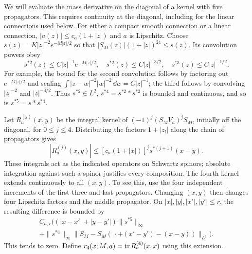 We will evaluate the mass derivative on the diagonal of a kernel with
five propagators. This requires continuity at the diagonal, including
for the linear connections used below. For either a compact smooth
connection or a linear connection, $|a(z)|\le c_a(1+|z|)$ and
$a$ is Lipschitz. Choose
$s(z)=K|z|^{-2}e^{-M|z|/2}$ so that
$|S_M(z)|(1+|z|)^{24}\le s(z)$. Its convolution powers obey
\begin{equation}\label{eq:probe-convolutions}
 s^{*2}(z)\le C|z|^{-1}e^{-M|z|/2},\quad
 s^{*2}(z)\le C|z|^{-3/2},\quad
 s^{*3}(z)\le C|z|^{-1/2}.
\end{equation}
For example, the bound for the second convolution follows by factoring
out $e^{-M|z|/2}$ and scaling
$\int|z-w|^{-2}|w|^{-2}\,\dd w=C|z|^{-1}$; the third follows by
convolving $|z|^{-2}$ and $|z|^{-3/2}$. Thus $s^{*2}\in L^2$,
$s^{*4}=s^{*2}*s^{*2}$ is bounded and continuous, and so is
$s^{*5}=s*s^{*4}$.

Let $R_a^{(j)}(x,y)$ be the integral kernel of
$(-1)^j(S_MV_a)^jS_M$, initially off the diagonal, for $0\le j\le4$.
Distributing the factors $1+|z_l|$ along the chain of propagators gives
\begin{equation}\label{eq:probe-kernel-majorant}
 |R_a^{(j)}(x,y)|\le[c_a(1+|x|)]^j s^{*(j+1)}(x-y).
\end{equation}
These integrals act as the indicated operators on Schwartz spinors;
absolute integration against such a spinor justifies every composition.
The fourth kernel extends continuously to all $(x,y)$. To see this,
use the four independent increments of the first three and last
propagators. Changing $(x,y)$ then changes four Lipschitz factors and
the middle propagator. On $|x|,|y|,|x'|,|y'|\le r$, the resulting
difference is bounded by
\begin{multline}\label{eq:probe-kernel-continuity}
 C_{a,r}\bigl((|x-x'|+|y-y'|)\|s^{*5}\|_\infty\\
 +\|s^{*4}\|_\infty
       \|S_M-S_M(\,\cdot+(x'-y')-(x-y))\|_{L^1}\bigr).
\end{multline}
This tends to zero. Define
$r_4(x;M,a)=\operatorname{tr} R_a^{(4)}(x,x)$ using this extension.

